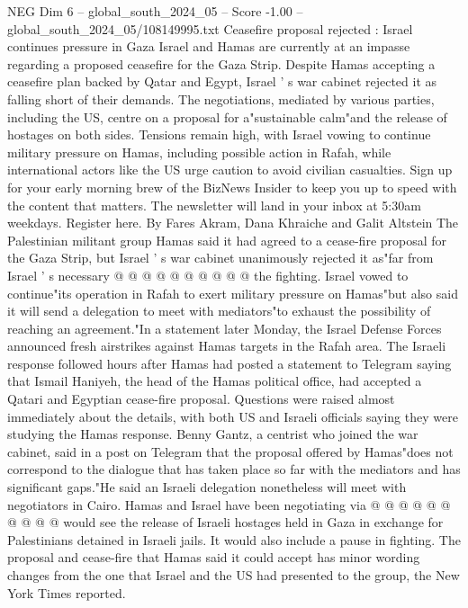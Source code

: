 \begin{textsample}{NEG Dim 6 – global\_south\_2024\_05 – Score -1.00 – global\_south\_2024\_05/108149995.txt}  \label{ex:f6_neg_239}
Ceasefire proposal rejected : Israel continues pressure in Gaza Israel and Hamas are currently at an impasse regarding a proposed ceasefire for the Gaza Strip.
Despite Hamas accepting a ceasefire plan backed by Qatar and Egypt, Israel ' s war cabinet rejected it as falling short of their demands.
The negotiations, mediated by various parties, including the US, centre on a proposal for a"sustainable calm"and the release of hostages on both sides.
Tensions remain high, with Israel vowing to continue military pressure on Hamas, including possible action in Rafah, while international actors like the US urge caution to avoid civilian casualties.
Sign up for your early morning brew of the BizNews Insider to keep you up to speed with the content that matters.
The newsletter will land in your inbox at 5:30am weekdays.
Register here.
By Fares Akram, Dana Khraiche and Galit Altstein The Palestinian militant group Hamas said it had agreed to a cease-fire proposal for the Gaza Strip, but Israel ' s war cabinet unanimously rejected it as"far from Israel ' s necessary @ @ @ @ @ @ @ @ @ @ the fighting.
Israel vowed to continue"its operation in Rafah to exert military pressure on Hamas"but also said it will send a delegation to meet with mediators"to exhaust the possibility of reaching an agreement."In a statement later Monday, the Israel Defense Forces announced fresh airstrikes against Hamas targets in the Rafah area.
The Israeli response followed hours after Hamas had posted a statement to Telegram saying that Ismail Haniyeh, the head of the Hamas political office, had accepted a Qatari and Egyptian cease-fire proposal.
Questions were raised almost immediately about the details, with both US and Israeli officials saying they were studying the Hamas response.
Benny Gantz, a centrist who joined the war cabinet, said in a post on Telegram that the proposal offered by Hamas"does not correspond to the dialogue that has taken place so far with the mediators and has significant gaps."He said an Israeli delegation nonetheless will meet with negotiators in Cairo.
Hamas and Israel have been negotiating via @ @ @ @ @ @ @ @ @ @ would see the release of Israeli hostages held in Gaza in exchange for Palestinians detained in Israeli jails.
It would also include a pause in fighting.
The proposal and cease-fire that Hamas said it could accept has minor wording changes from the one that Israel and the US had presented to the group, the New York Times reported.

\end{textsample}
